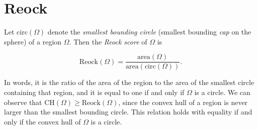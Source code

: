 \section{Reock}\label{sec:reock}

Let $\mathrm{circ}(\Omega)$ denote the \textit{smallest bounding
circle} (smallest bounding \textit{cap} on the sphere) of a region
$\Omega$.  Then the \textit{Reock score} of $\Omega$ is 

$$\mathrm{Reock}(\Omega)=
\frac{\mathrm{area}(\Omega)}{\mathrm{area}(\mathrm{circ}(\Omega))}.$$

In words, it is the ratio of the area of the region to the area of the
smallest circle containing that region, and it is equal to one if and
only if $\Omega$ is a circle.  We can observe that
$\mathrm{CH}(\Omega)\geq \mathrm{Reock}(\Omega)$, since the convex
hull of a region is never larger than the smallest bounding circle.
This relation holds with equality if and only if the convex hull of
$\Omega$ is a circle.  


